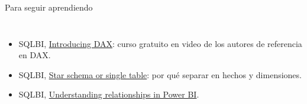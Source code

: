 \documentclass[aspectratio=169,11pt]{beamer}
\begin{document}
\begin{frame}[t]{Para seguir aprendiendo}
\begin{columns}[T,onlytextwidth]
\begin{itemize}
      \item SQLBI, \href{https://www.sqlbi.com/p/introducing-dax-video-course/}{\color{esumerOrange}Introducing DAX}:
        curso gratuito en video de los autores de referencia en DAX.
      \item SQLBI, \href{https://www.sqlbi.com/articles/power-bi-star-schema-or-single-table/}{\color{esumerOrange}Star schema or single table}:
        por qué separar en hechos y dimensiones.
      \item SQLBI, \href{https://www.sqlbi.com/articles/understanding-relationships-in-power-bi/}{\color{esumerOrange}Understanding relationships in Power BI}.
    \end{itemize}
  \end{columns}
\end{frame}
\end{document}
